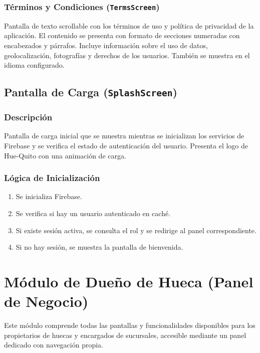 \documentclass[11pt, a4paper, oneside]{report}
\begin{document}
\subsection{Términos y Condiciones (\texttt{TermsScreen})}
Pantalla de texto scrollable con los términos de uso y política de privacidad de la aplicación. El contenido se presenta con formato de secciones numeradas con encabezados y párrafos. Incluye información sobre el uso de datos, geolocalización, fotografías y derechos de los usuarios. También se muestra en el idioma configurado.

\section{Pantalla de Carga (\texttt{SplashScreen})}

\subsection{Descripción}
Pantalla de carga inicial que se muestra mientras se inicializan los servicios de Firebase y se verifica el estado de autenticación del usuario. Presenta el logo de Hue-Quito con una animación de carga.

\subsection{Lógica de Inicialización}
\begin{enumerate}
  \item Se inicializa Firebase.
  \item Se verifica si hay un usuario autenticado en caché.
  \item Si existe sesión activa, se consulta el rol y se redirige al panel correspondiente.
  \item Si no hay sesión, se muestra la pantalla de bienvenida.
\end{enumerate}


\chapter{Módulo de Dueño de Hueca (Panel de Negocio)}

Este módulo comprende todas las pantallas y funcionalidades disponibles para los propietarios de huecas y encargados de sucursales, accesible mediante un panel dedicado con navegación propia.
\end{document}
